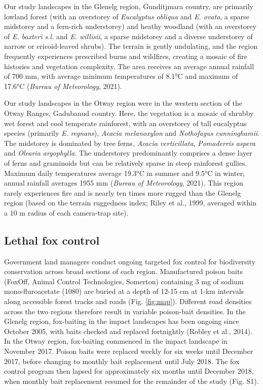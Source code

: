 \documentclass[]{elsarticle} %
\begin{document}
Our study landscapes in the Glenelg region, Gunditjmara country, are primarily lowland forest (with an overstorey of \emph{Eucalyptus obliqua} and \emph{E. ovata}, a sparse midstorey and a fern-rich understorey) and heathy woodland (with an overstorey of \emph{E. baxteri s.l.} and \emph{E. willisii}, a sparse midstorey and a diverse understorey of narrow or ericoid-leaved shrubs). The terrain is gently undulating, and the region frequently experiences prescribed burns and wildfires, creating a mosaic of fire histories and vegetation complexity. The area receives an average annual rainfall of 700 mm, with average minimum temperatures of 8.1°C and maximum of 17.6°C (\emph{Bureau of Meteorology}, 2021).

Our study landscapes in the Otway region were in the western section of the Otway Ranges, Gadubanud country. Here, the vegetation is a mosaic of shrubby wet forest and cool temperate rainforest, with an overstorey of tall eucalyptus species (primarily \emph{E. regnans}), \emph{Acacia melanoxylon} and \emph{Nothofagus cunninghamii}. The midstorey is dominated by tree ferns, \emph{Acacia verticillata}, \emph{Pomaderris aspera} and \emph{Olearia argophylla}. The understorey predominantly comprises a dense layer of ferns and graminoids but can be relatively sparse in steep rainforest gullies. Maximum daily temperatures average 19.3°C in summer and 9.5°C in winter; annual rainfall averages 1955 mm (\emph{Bureau of Meteorology}, 2021). This region rarely experiences fire and is nearly ten times more rugged than the Glenelg region (based on the terrain ruggedness index; Riley et al., 1999, averaged within a 10 m radius of each camera-trap site).

\hypertarget{lethal-fox-control}{%
\subsection{Lethal fox control}\label{lethal-fox-control}}

Government land managers conduct ongoing targeted fox control for biodiversity conservation across broad sections of each region. Manufactured poison baits (FoxOff, Animal Control Technologies, Somerton) containing 3 mg of sodium mono-fluroacetate (1080) are buried at a depth of 12-15 cm at 1-km intervals along accessible forest tracks and roads (Fig. \ref{fig:map}). Different road densities across the two regions therefore result in variable poison-bait densities. In the Glenelg region, fox-baiting in the impact landscapes has been ongoing since October 2005, with baits checked and replaced fortnightly (Robley et al., 2014). In the Otway region, fox-baiting commenced in the impact landscape in November 2017. Poison baits were replaced weekly for six weeks until December 2017, before changing to monthly bait replacement until July 2018. The fox control program then lapsed for approximately six months until December 2018, when monthly bait replacement resumed for the remainder of the study (Fig. S1).
\end{document}
